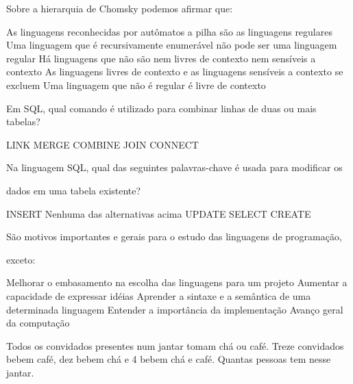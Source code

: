 \documentclass[12pt, addpoints]{exam}
\begin{document}
\begin{questions}
\question

Sobre a hierarquia de Chomsky podemos afirmar que:
\begin{choices}
\choice As linguagens reconhecidas por autômatos a pilha são as linguagens regulares
\choice Uma linguagem que é recursivamente enumerável não pode ser uma linguagem regular
\choice Há linguagens que não são nem livres de contexto nem sensíveis a contexto
\choice As linguagens livres de contexto e as linguagens sensíveis a contexto se excluem
\choice Uma linguagem que não é regular é livre de contexto
\end{choices}

\question

Em SQL, qual comando é utilizado para combinar linhas de duas ou mais tabelas?


\begin{choices}
\choice LINK
\choice MERGE
\choice COMBINE
\choice JOIN
\choice CONNECT
\end{choices}

\question

Na linguagem SQL, qual das seguintes palavras-chave é usada para modificar os

dados em uma tabela existente?


\begin{choices}
\choice INSERT
\choice Nenhuma das alternativas acima
\choice UPDATE
\choice SELECT
\choice CREATE
\end{choices}

\question

São motivos importantes e gerais para o estudo das linguagens de programação,

exceto:
\begin{choices}
\choice Melhorar o embasamento na escolha das linguagens para um projeto
\choice Aumentar a capacidade de expressar idéias
\choice Aprender a sintaxe e a semântica de uma determinada linguagem
\choice Entender a importância da implementação
\choice Avanço geral da computação
\end{choices}

\question

Todos os convidados presentes num jantar tomam chá ou café. Treze convidados bebem café, dez bebem chá e 4 bebem chá e café. Quantas pessoas tem nesse jantar.


\begin{choices}
\end{choices}


\end{questions}
\end{document}
